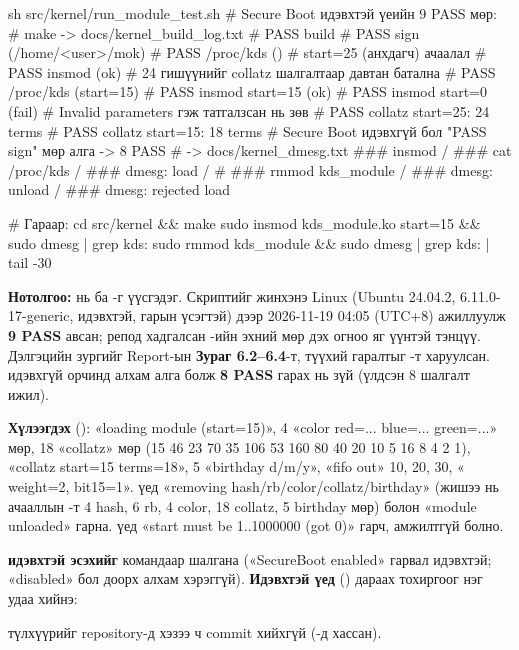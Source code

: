 \begin{codeblock}
sh src/kernel/run_module_test.sh        # Secure Boot идэвхтэй үеийн 9 PASS мөр:
#   make -> docs/kernel_build_log.txt
#   PASS build
#   PASS sign (/home/<user>/mok)
#   PASS /proc/kds ()                    # start=25 (анхдагч) ачаалал
#   PASS insmod  (ok)                    # 24 гишүүнийг collatz шалгалтаар давтан батална
#   PASS /proc/kds (start=15)
#   PASS insmod start=15 (ok)
#   PASS insmod start=0 (fail)           # Invalid parameters гэж татгалзсан нь зөв
#   PASS collatz start=25: 24 terms
#   PASS collatz start=15: 18 terms      # Secure Boot идэвхгүй бол "PASS sign" мөр алга -> 8 PASS
#   -> docs/kernel_dmesg.txt  ### insmod / ### cat /proc/kds / ### dmesg: load /
#                             ### rmmod kds_module / ### dmesg: unload / ### dmesg: rejected load

# Гараар:
cd src/kernel && make
sudo insmod kds_module.ko start=15 && sudo dmesg | grep kds:
sudo rmmod kds_module && sudo dmesg | grep kds: | tail -30
\end{codeblock}
\textbf{Нотолгоо:}  нь  ба -г үүсгэдэг. Скриптийг жинхэнэ Linux (Ubuntu 24.04.2,  6.11.0-17-generic,  идэвхтэй,  гарын үсэгтэй) дээр 2026-11-19 04:05 (UTC+8) ажиллуулж \textbf{9 PASS} авсан; репод хадгалсан -ийн эхний мөр дэх огноо яг үүнтэй тэнцүү. Дэлгэцийн зургийг Report-ын \textbf{Зураг 6.2--6.4}-т, түүхий гаралтыг -т харуулсан.  идэвхгүй орчинд  алхам алга болж \textbf{8 PASS} гарах нь зүй (үлдсэн 8 шалгалт ижил).

\textbf{Хүлээгдэх } (): «loading module (start=15)», 4 «color red=... blue=... green=...» мөр, 18 «collatz» мөр (15 46 23 70 35 106 53 160 80 40 20 10 5 16 8 4 2 1), «collatz start=15 terms=18», 5 «birthday d/m/y», «fifo out» 10, 20, 30, « weight=2, bit15=1».  үед «removing hash/rb/color/collatz/birthday» (жишээ нь  ачааллын -т 4 hash, 6 rb, 4 color, 18 collatz, 5 birthday мөр) болон «module unloaded» гарна.  үед «start must be 1..1000000 (got 0)» гарч,  амжилтгүй болно.

\textbf{ идэвхтэй эсэхийг}  командаар шалгана («SecureBoot enabled» гарвал идэвхтэй; «disabled» бол доорх алхам хэрэггүй). \textbf{Идэвхтэй үед} (\newline{}) дараах тохиргоог нэг удаа хийнэ:
 түлхүүрийг repository-д хэзээ ч commit хийхгүй (-д хассан).

